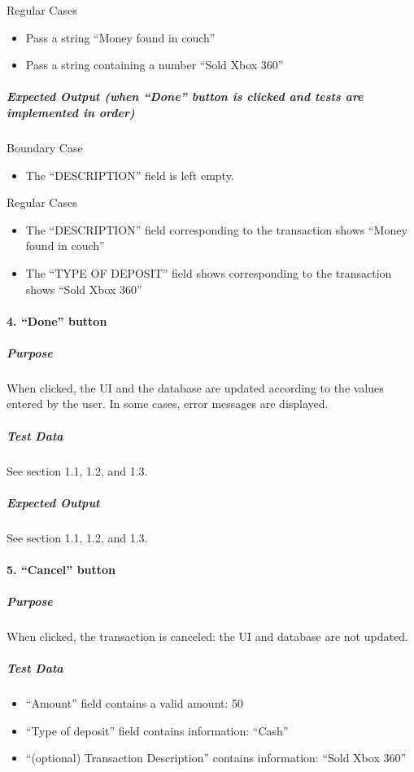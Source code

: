 \documentclass[12pt]{article}
\begin{document}
Regular Cases
\begin{itemize}
  \item Pass a string “Money found in couch”
  \item Pass a string containing a number “Sold Xbox 360”
 \end{itemize}
 
\subparagraph{Expected Output (when “Done” button is clicked and tests are implemented in order)}
 
Boundary Case
\begin{itemize}
  \item The “DESCRIPTION” field is left empty. 
\end{itemize}

Regular Cases
\begin{itemize}
  \item The “DESCRIPTION” field corresponding to the transaction shows “Money found in couch” 
  \item The “TYPE OF DEPOSIT” field shows corresponding to the transaction shows “Sold Xbox 360”
 \end{itemize}

\paragraph{4. “Done” button}

\subparagraph{Purpose} When clicked, the UI and the database are updated according to the values entered by the user. In some cases, error messages are displayed.
 
\subparagraph{Test Data} See section 1.1, 1.2, and 1.3.
 
\subparagraph{Expected Output}
See section 1.1, 1.2, and 1.3.
 
\paragraph{5. “Cancel” button}
 
\subparagraph{Purpose} When clicked, the transaction is canceled: the UI and database are not updated.
 
\subparagraph{Test Data}
\begin{itemize}
  \item “Amount” field contains a valid amount: 50
  \item “Type of deposit” field contains information: “Cash”
  \item “(optional) Transaction Description” contains information: “Sold Xbox 360”
 \end{itemize}
\end{document}
